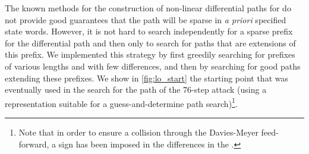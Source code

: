 The known methods for the construction of non-linear differential paths for \sha do not provide good guarantees that the path will be sparse in \emph{a priori} specified state words. However, it is
not hard to search independently for a sparse prefix for the differential path and then only to search for paths that are extensions of this prefix.
We implemented this strategy by first greedily searching for prefixes of various lengths and with few differences, and then by searching for good paths extending these prefixes.
We show in \autoref{fig:lo_start} the starting point that was eventually used in the search for the path of the 76-step attack (using a representation suitable for a guess-and-determine
path search)\footnote{Note that in order to ensure a collision through the Davies-Meyer feed-forward, a sign has been imposed in the differences in the \iv.}.


